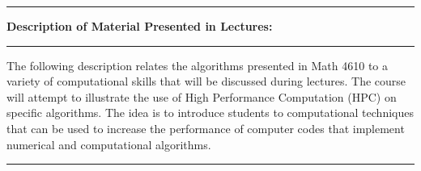 \documentclass[10pt,fleqn]{article}
\begin{document}
\vskip0.1in\hrule\vskip0.1in
\noindent
{\bf Description of Material Presented in Lectures:}
\vskip0.1in\hrule\vskip0.1in
\noindent
The following description relates the algorithms presented in Math 4610 to a
variety of computational skills that will be discussed during lectures. The
course will attempt to illustrate the use of High Performance Computation (HPC)
on specific algorithms. The idea is to introduce students to computational
techniques that can be used to increase the performance of computer codes that
implement numerical and computational algorithms.

\vskip0.1in\hrule\vskip0.1in
\noindent
\end{document}
